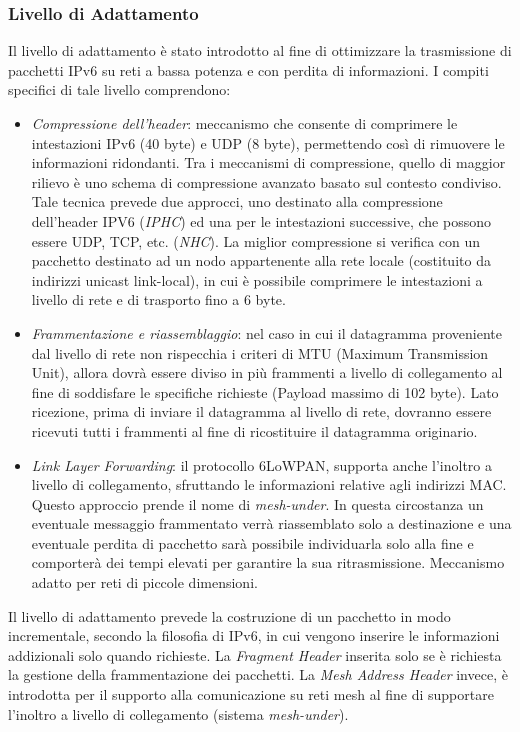 \subsubsection{Livello di Adattamento}
Il livello di adattamento è stato introdotto al fine di ottimizzare la trasmissione di pacchetti IPv6 su reti a bassa potenza e con perdita di informazioni. I compiti specifici di tale livello comprendono:
\begin{itemize}
    \item \textit{Compressione dell'header}: meccanismo che consente di comprimere le intestazioni IPv6 (40 byte) e UDP (8 byte), permettendo così di rimuovere le informazioni ridondanti. Tra i meccanismi di compressione, quello di maggior rilievo è uno schema di compressione avanzato basato sul contesto condiviso. Tale tecnica prevede due approcci, uno destinato alla compressione dell'header IPV6 (\textit{IPHC}) ed una per le intestazioni successive, che possono essere UDP, TCP, etc. (\textit{NHC}). La miglior compressione si verifica con un pacchetto destinato ad un nodo appartenente alla rete locale (costituito da indirizzi unicast link-local), in cui è possibile comprimere le intestazioni a livello di rete e di trasporto fino a 6 byte.
    
    \item \textit{Frammentazione e riassemblaggio}: nel caso in cui il datagramma proveniente dal livello di rete non rispecchia i criteri di MTU (Maximum Transmission Unit), allora dovrà essere diviso in più frammenti a livello di collegamento al fine di soddisfare le specifiche richieste (Payload massimo di 102 byte). Lato ricezione, prima di inviare il datagramma al livello di rete, dovranno essere ricevuti tutti i frammenti al fine di ricostituire il datagramma originario.
    
    \item \textit{Link Layer Forwarding}: il protocollo 6LoWPAN, supporta anche l'inoltro a livello di collegamento, sfruttando le informazioni relative agli indirizzi MAC. Questo approccio prende il nome di \textit{mesh-under}. In questa circostanza un eventuale messaggio frammentato verrà riassemblato solo a destinazione e una eventuale perdita di pacchetto sarà possibile individuarla solo alla fine e comporterà dei tempi elevati per garantire la sua ritrasmissione. Meccanismo adatto per reti di piccole dimensioni.
\end{itemize}

\noindent Il livello di adattamento prevede la costruzione di un pacchetto in modo incrementale, secondo la filosofia di IPv6, in cui vengono inserire le informazioni addizionali solo quando richieste. La \textit{Fragment Header} inserita solo se è richiesta la gestione della frammentazione dei pacchetti. La \textit{Mesh Address Header} invece, è introdotta per il supporto alla comunicazione su reti mesh al fine di supportare l'inoltro a livello di collegamento (sistema \textit{mesh-under}).


